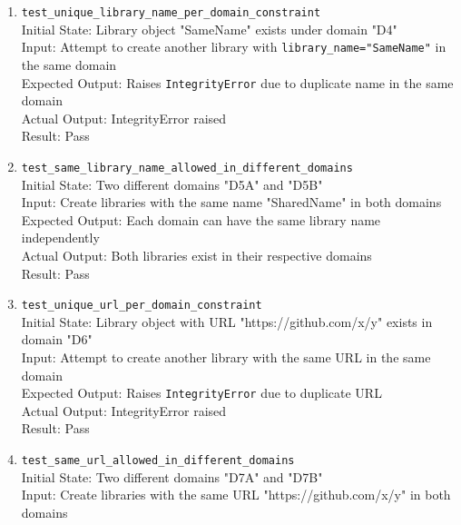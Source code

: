 \documentclass[12pt, titlepage]{article}
\begin{document}
\begin{enumerate}
      \\Actual Output: Matches expected default values
      \\Result: Pass
    \item \texttt{test\_unique\_library\_name\_per\_domain\_constraint} \label{test-unique-library-name-per-domain-constraint}
      \\Initial State: Library object "SameName" exists under domain "D4"
      \\Input: Attempt to create another library with \texttt{library\_name="SameName"} in the same domain
      \\Expected Output: Raises \texttt{IntegrityError} due to duplicate name in the same domain
      \\Actual Output: IntegrityError raised
      \\Result: Pass
    \item \texttt{test\_same\_library\_name\_allowed\_in\_different\_domains} \label{test-same-library-name-allowed-in-different-domains}
      \\Initial State: Two different domains "D5A" and "D5B"
      \\Input: Create libraries with the same name "SharedName" in both domains
      \\Expected Output: Each domain can have the same library name independently
      \\Actual Output: Both libraries exist in their respective domains
      \\Result: Pass
    \item \texttt{test\_unique\_url\_per\_domain\_constraint} \label{test-unique-url-per-domain-constraint}
      \\Initial State: Library object with URL "https://github.com/x/y" exists in domain "D6"
      \\Input: Attempt to create another library with the same URL in the same domain
      \\Expected Output: Raises \texttt{IntegrityError} due to duplicate URL
      \\Actual Output: IntegrityError raised
      \\Result: Pass
    \item \texttt{test\_same\_url\_allowed\_in\_different\_domains} \label{test-same-url-allowed-in-different-domains}
      \\Initial State: Two different domains "D7A" and "D7B"
      \\Input: Create libraries with the same URL "https://github.com/x/y" in both domains

\end{enumerate}
\end{document}
